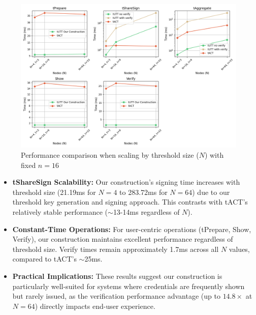 \begin{figure}[!htb]
    \centering
    \vspace{-0.5em}
    \includegraphics[width=0.9\linewidth]{figures/chap5_tutt_scale_by_N_nodes.png}
    \caption{Performance comparison when scaling by threshold size ($N$) with fixed $n=16$}
    \label{fig:chap5_tutt_scale_by_N}
    \vspace{-0.5em}
\end{figure}

\begin{itemize}
    \item \textbf{tShareSign Scalability:} Our construction's signing time increases with threshold size (21.19ms for $N=4$ to 283.72ms for $N=64$) due to our threshold key generation and signing approach. This contrasts with tACT's relatively stable performance ($\sim$13-14ms regardless of $N$).

    \item \textbf{Constant-Time Operations:} For user-centric operations (tPrepare, Show, Verify), our construction maintains excellent performance regardless of threshold size. Verify times remain approximately 1.7ms across all $N$ values, compared to tACT's $\sim$25ms.

    \item \textbf{Practical Implications:} These results suggest our construction is particularly well-suited for systems where credentials are frequently shown but rarely issued, as the verification performance advantage (up to $14.8\times$ at $N=64$) directly impacts end-user experience.
\end{itemize}


